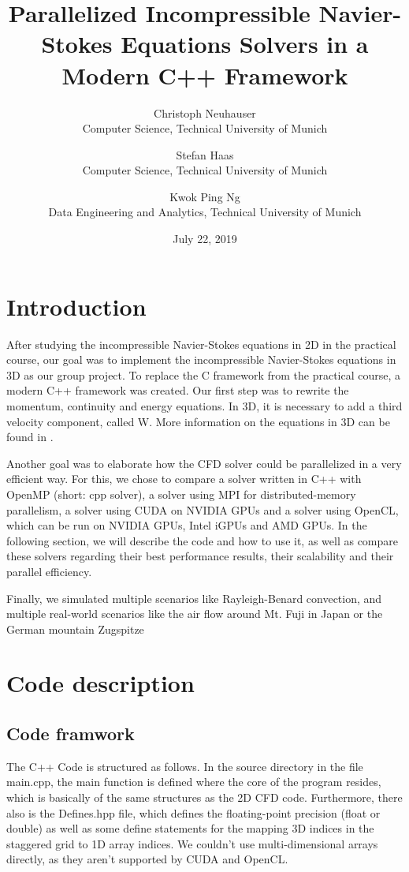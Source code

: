 \documentclass{article}%
\title{Parallelized Incompressible Navier-Stokes Equations Solvers in a Modern C++ Framework}
\date{July 22, 2019}
\author{Christoph Neuhauser\\ Computer Science, Technical University of Munich 
\and Stefan Haas\\ Computer Science, Technical University of Munich
\and Kwok Ping Ng\\ Data Engineering and Analytics, Technical University of Munich}
\begin{document}
\maketitle

\section{Introduction}

After studying the incompressible Navier-Stokes equations in 2D in the practical course, our goal was to implement the incompressible Navier-Stokes equations in 3D as our group project. To replace the C framework from the practical course, a modern C++ framework was created. Our first step was to rewrite the momentum, continuity and energy equations. In 3D, it is necessary to add a third velocity component, called W. More information on the equations in 3D can be found in \cite{griebel}.

Another goal was to elaborate how the CFD solver could be parallelized in a very efficient way. For this, we chose to compare a solver written in C++ with OpenMP (short: cpp solver), a solver using MPI for distributed-memory parallelism, a solver using CUDA on NVIDIA GPUs and a solver using OpenCL, which can be run on NVIDIA GPUs, Intel iGPUs and AMD GPUs. In the following section, we will describe the code and how to use it, as well as compare these solvers regarding their best performance results, their scalability and their parallel efficiency.

Finally, we simulated multiple scenarios like Rayleigh-Benard convection, and multiple real-world scenarios like the air flow around Mt. Fuji in Japan or the German mountain Zugspitze

\section{Code description}
\subsection{Code framwork}
The C++ Code is structured as follows. In the source directory in the file main.cpp, the main function is defined where the core of the program resides, which is basically of the same structures as the 2D CFD code. Furthermore, there also is the Defines.hpp file, which defines the floating-point precision (float or double) as well as some define statements for the mapping 3D indices in the staggered grid to 1D array indices. We couldn't use multi-dimensional arrays directly, as they aren't supported by CUDA and OpenCL.
\end{document}
